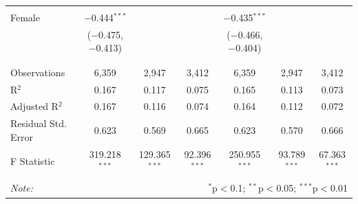 \documentclass[12pt,a4paper]{article}
\numberwithin{equation}{section}
\begin{document}
\begin{landscape}
\begin{table}[!htbp]
\begin{tabular}{@{\extracolsep{5pt}}lcccccc}
			& & & & & & \\ 
			Female & $-$0.444$^{***}$ &  &  & $-$0.435$^{***}$ &  &  \\ 
			& ($-$0.475, $-$0.413) &  &  & ($-$0.466, $-$0.404) &  &  \\ 
			& & & & & & \\ 
			\hline \\[-1.8ex] 
			Observations & 6,359 & 2,947 & 3,412 & 6,359 & 2,947 & 3,412 \\ 
			R$^{2}$ & 0.167 & 0.117 & 0.075 & 0.165 & 0.113 & 0.073 \\ 
			Adjusted R$^{2}$ & 0.167 & 0.116 & 0.074 & 0.164 & 0.112 & 0.072 \\ 
			Residual Std. Error & 0.623 & 0.569 & 0.665 & 0.623 & 0.570 & 0.666 \\ 
			F Statistic & 319.218$^{***}$ & 129.365$^{***}$ & 92.396$^{***}$ & 250.955$^{***}$ & 93.789$^{***}$ & 67.363$^{***}$ \\ 
			\hline 
			\hline \\[-1.8ex] 
			\textit{Note:}  & \multicolumn{6}{r}{$^{*}$p$<$0.1; $^{**}$p$<$0.05; $^{***}$p$<$0.01} \\ 
		\end{tabular} 
	\end{table} 
	
\end{landscape}

\newpage
\end{document}
